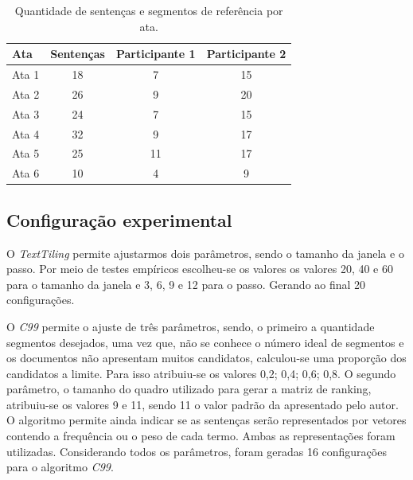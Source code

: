 \begin{table}[!h]
	\centering
	\begin{tabular}{|l|c|c|c|} \hline
		\textbf{Ata} & \textbf{Sentenças}  & 
		\textbf{Participante 1}  & 
		\textbf{Participante 2} \\	\hline

		Ata 1 & 18 & 7  & 15 \\ \hline 
		Ata 2 & 26 & 9  & 20 \\ \hline 
		Ata 3 & 24 & 7  & 15 \\ \hline 
		Ata 4 & 32 & 9  & 17 \\ \hline 
		Ata 5 & 25 & 11 & 17 \\ \hline 
		Ata 6 & 10 & 4  & 9  \\ \hline 

	\end{tabular}
	\caption{Quantidade de sentenças e segmentos de referência por ata.}
	\label{tab:segmentacaoreferencia}
\end{table}







\subsection{Configuração experimental}
	\label{subsec:configuracaoexperimental}

%
O \textit{TextTiling} permite ajustarmos dois parâmetros, sendo o tamanho da janela e o passo. Por meio de testes empíricos escolheu-se os valores os valores 20, 40 e 60 para o tamanho da janela e 3, 6, 9 e 12 para o passo. Gerando ao final 20 configurações.
%

O \textit{C99} permite o ajuste de três parâmetros, sendo, o primeiro a quantidade segmentos desejados, uma vez que, não se conhece o número ideal de segmentos e os documentos não apresentam muitos candidatos, calculou-se uma proporção dos candidatos a limite. Para isso atribuiu-se os valores {0,2; 0,4; 0,6; 0,8}. O segundo parâmetro, o tamanho do quadro utilizado para gerar a matriz de ranking, atribuiu-se os valores 9 e 11, sendo 11 o valor padrão da apresentado pelo autor. O algoritmo permite ainda indicar se as sentenças serão representados por vetores contendo a frequência ou o peso de cada termo. Ambas as representações foram utilizadas. Considerando todos os parâmetros, foram geradas 16 configurações para o algoritmo \textit{C99}.





